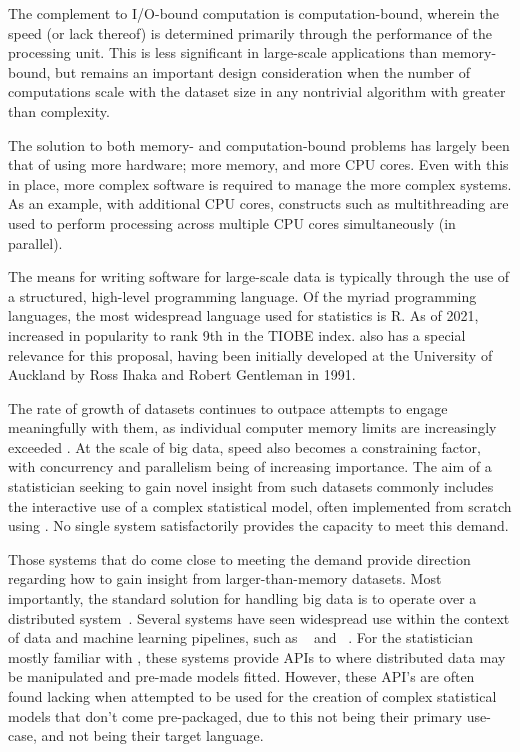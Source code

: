 The complement to I/O-bound computation is computation-bound,
wherein the speed (or lack thereof) is determined primarily through the
performance of the processing unit. This is less significant in
large-scale applications than memory-bound, but remains an important
design consideration when the number of computations scale with the
dataset size in any nontrivial algorithm with greater than
 complexity.

The solution to both memory- and computation-bound problems has largely
been that of using more hardware; more memory, and more CPU cores. Even
with this in place, more complex software is required to manage the more
complex systems. As an example, with additional CPU cores, constructs
such as multithreading are used to perform processing across multiple
CPU cores simultaneously (in parallel).

The means for writing software for large-scale data is typically through
the use of a structured, high-level programming language. Of the myriad
programming languages, the most widespread language used for statistics
is R. As of 2021, \R{} increased in popularity to rank 9th in the TIOBE
index. \R{} also has a special relevance for this proposal, having been
initially developed at the University of Auckland by Ross Ihaka and
Robert Gentleman in 1991\cite{ihaka1996r}.

The rate of growth of datasets continues to outpace attempts to engage meaningfully with them, as individual computer memory limits are increasingly exceeded \cite{kleppmann2017dataintensive}.
At the scale of big data, speed also becomes a constraining factor, with concurrency and parallelism being of increasing importance.
The aim of a statistician seeking to gain novel insight from such datasets commonly includes the interactive use of a complex statistical model, often implemented from scratch using \R{}.
No single system satisfactorily provides the capacity to meet this demand.

Those systems that do come close to meeting the demand provide direction regarding how to gain insight from larger-than-memory datasets.
Most importantly, the standard solution for handling big data is to operate over a distributed system~\cite{boja2012distributed}.
Several systems have seen widespread use within the context of data and machine learning pipelines, such as ~\cite{zaharia2016apache} and ~\cite{shvachko2010hadoop}.
For the statistician mostly familiar with \R{}, these systems provide APIs to \R{} where distributed data may be manipulated and pre-made models fitted.
However, these API's are often found lacking when attempted to be used for the creation of complex statistical models that don't come pre-packaged, due to this not being their primary use-case, and \R{} not being their target language.


